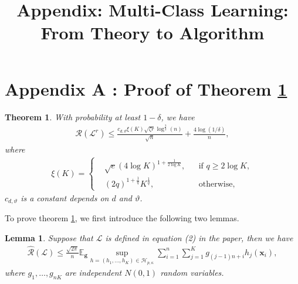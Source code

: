 \documentclass{article}
\title{Appendix: Multi-Class Learning: From Theory to Algorithm}
\author{
}
\newtheorem{lemma}{Lemma}
\newtheorem{theorem}{Theorem}
\begin{document}

\maketitle

\section{Appendix A : Proof of Theorem \ref{rademacherlocal}}
\begin{theorem}
\label{rademacherlocal}
With probability at least $1-\delta$,
  we have
  \begin{align*}
    \mathcal{R}(\mathcal{L}^r) \leq \frac{c_{d,\vartheta}\xi(K)\sqrt{\zeta r}\log^{\frac{3}{2}}(n)}{\sqrt{n}}+\frac{4\log(1/\delta)}{n},
  \end{align*}
  where
  \begin{align*}
  \xi(K)=
  \left\{
      \begin{aligned}
      &\sqrt{e}(4\log K)^{1+\frac{1}{2\log K}}, &&\text{if } q\geq 2\log K,\\
      &(2q)^{1+\frac{1}{q}}K^{\frac{1}{q}}, &&\text{otherwise},
      \end{aligned}
      \right.
  \end{align*}
  $c_{d,\vartheta}$ is a constant depends on $d$ and $\vartheta$.
\end{theorem}
To prove theorem \ref{rademacherlocal}, we first introduce the following two lemmas.
\begin{lemma}
\label{hatRLlemma}\cite{lei2015multi}
Suppose that $\mathcal{L}$ is defined in equation \textrm{(2)} in the paper,
then we have
\begin{align*}
  \hat{\mathcal{R}}(\mathcal{L})\leq\frac{\sqrt{2\pi}}{n}\mathbb{E}_{\mathbf g}\sup_{h=(h_1,\ldots,h_K)
  \in\mathcal{H}_{p,\kappa}}\sum_{i=1}^n\sum_{j=1}^Kg_{(j-1)n+i}h_j(\mathbf x_i),
\end{align*}
 where $g_1,\ldots,g_{nK}$ are  independent $N(0,1)$ random variables.
\end{lemma}
\end{document}
